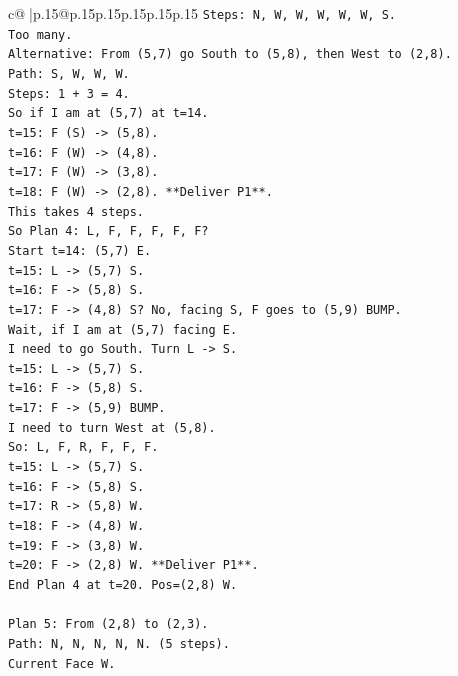 \documentclass{article}
\begin{document}
{\begin{supertabular}{c@{$\;$}|p{.15\linewidth}@{}p{.15\linewidth}p{.15\linewidth}p{.15\linewidth}p{.15\linewidth}p{.15\linewidth}}
{{{\texttt{Steps: N, W, W, W, W, W, S.} \\
\texttt{Too many.} \\
\texttt{Alternative: From (5,7) go South to (5,8), then West to (2,8).} \\
\texttt{Path: S, W, W, W.} \\
\texttt{Steps: 1 + 3 = 4.} \\
\texttt{So if I am at (5,7) at t=14.} \\
\texttt{t=15: F (S) {-}> (5,8).} \\
\texttt{t=16: F (W) {-}> (4,8).} \\
\texttt{t=17: F (W) {-}> (3,8).} \\
\texttt{t=18: F (W) {-}> (2,8). **Deliver P1**.} \\
\texttt{This takes 4 steps.} \\
\texttt{So Plan 4: L, F, F, F, F, F?} \\
\texttt{Start t=14: (5,7) E.} \\
\texttt{t=15: L {-}> (5,7) S.} \\
\texttt{t=16: F {-}> (5,8) S.} \\
\texttt{t=17: F {-}> (4,8) S? No, facing S, F goes to (5,9) BUMP.} \\
\texttt{Wait, if I am at (5,7) facing E.} \\
\texttt{I need to go South. Turn L {-}> S.} \\
\texttt{t=15: L {-}> (5,7) S.} \\
\texttt{t=16: F {-}> (5,8) S.} \\
\texttt{t=17: F {-}> (5,9) BUMP.} \\
\texttt{I need to turn West at (5,8).} \\
\texttt{So: L, F, R, F, F, F.} \\
\texttt{t=15: L {-}> (5,7) S.} \\
\texttt{t=16: F {-}> (5,8) S.} \\
\texttt{t=17: R {-}> (5,8) W.} \\
\texttt{t=18: F {-}> (4,8) W.} \\
\texttt{t=19: F {-}> (3,8) W.} \\
\texttt{t=20: F {-}> (2,8) W. **Deliver P1**.} \\
\texttt{End Plan 4 at t=20. Pos=(2,8) W.} \\
\\ 
\texttt{Plan 5: From (2,8) to (2,3).} \\
\texttt{Path: N, N, N, N, N. (5 steps).} \\
\texttt{Current Face W.} \\
}}}
\end{supertabular}}
\end{document}

